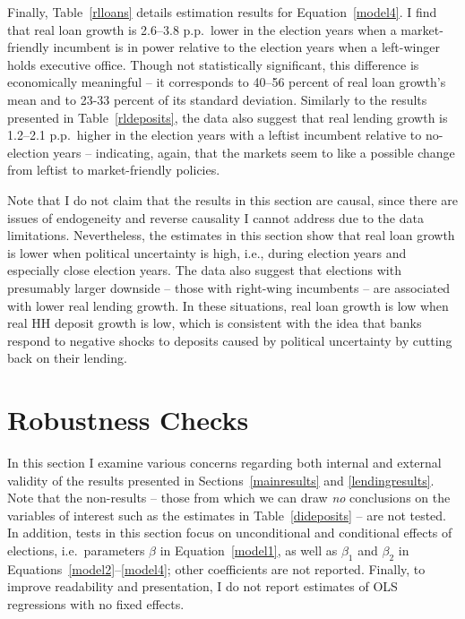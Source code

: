 \documentclass[12pt,a4paper]{article}
\begin{document}
Finally, Table~\ref{rlloans} details estimation results for Equation~\eqref{model4}. I find that real loan growth is 2.6--3.8 p.p.\ lower in the election years when a market-friendly incumbent is in power relative to the election years when a left-winger holds executive office. Though not statistically significant, this difference is economically meaningful -- it corresponds to 40--56 percent of real loan growth's mean and to 23-33 percent of its standard deviation. Similarly to the results presented in Table~\ref{rldeposits}, the data also suggest that real lending growth is 1.2--2.1 p.p.\ higher in the election years with a leftist incumbent relative to no-election years -- indicating, again, that the markets seem to like a possible change from leftist to market-friendly policies.

Note that I do not claim that the results in this section are causal, since there are issues of endogeneity and reverse causality I cannot address due to the data limitations. Nevertheless, the estimates in this section show that real loan growth is lower when political uncertainty is high, i.e., during election years and especially close election years. The data also suggest that elections with presumably larger downside -- those with right-wing incumbents -- are associated with lower real lending growth. In these situations, real loan growth is low when real HH deposit growth is low, which is consistent with the idea that banks respond to negative shocks to deposits caused by political uncertainty by cutting back on their lending.

\section{Robustness Checks}\label{robustness}
In this section I examine various concerns regarding both internal and external validity of the results presented in Sections~\ref{mainresults} and \ref{lendingresults}. Note that the non-results -- those from which we can draw \emph{no} conclusions on the variables of interest such as the estimates in Table~\ref{dideposits} -- are not tested. In addition, tests in this section focus on unconditional and conditional effects of elections, i.e.\ parameters $\beta$ in Equation~\eqref{model1}, as well as $\beta_1$ and $\beta_2$ in Equations~\eqref{model2}--\eqref{model4}; other coefficients are not reported. Finally, to improve readability and presentation, I do not report estimates of OLS regressions with no fixed effects.
\end{document}
